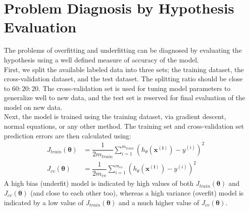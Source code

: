 \documentclass[a4paper, 12pt]{report}
\begin{document}
\section{Problem Diagnosis by Hypothesis Evaluation}
The problems of overfitting and underfitting can be diagnosed by evaluating the hypothesis using a well defined measure of accuracy of the model. \\
\break
First, we split the available labeled data into three sets; the training dataset, the cross-validation dataset, and the test dataset. The splitting ratio should be close to $60:20:20$. The cross-validation set is used for tuning model parameters to generalize well to new data, and the test set is reserved for final evaluation of the model on new data. \\
\break
Next, the model is trained using the training dataset, via gradient descent, normal equations, or any other method. The training set and cross-validation set prediction errors are then calculated using:
\begin{align*}
J_{train}\left(\bm{\theta}\right) &= \dfrac{1}{2m_{train}}\sum_{i=1}^{m_{train}}\left(h_{\theta}\left(\bm{x^{\left(i\right)}}\right)-y^{\left(i\right)}\right)^2 \\
J_{cv}\left(\bm{\theta}\right) &= \dfrac{1}{2m_{cv}}\sum_{i=1}^{m_{cv}}\left(h_{\theta}\left(\bm{x^{\left(i\right)}}\right)-y^{\left(i\right)}\right)^2
\end{align*}
A high bias (underfit) model is indicated by high values of both $J_{train}\left(\bm{\theta}\right)$ and $J_{cv}\left(\bm{\theta}\right)$ (and close to each other too), whereas a high variance (overfit) model is indicated by a low value of $J_{train}\left(\bm{\theta}\right)$ and a much higher value of $J_{cv}\left(\bm{\theta}\right)$.
\end{document}
